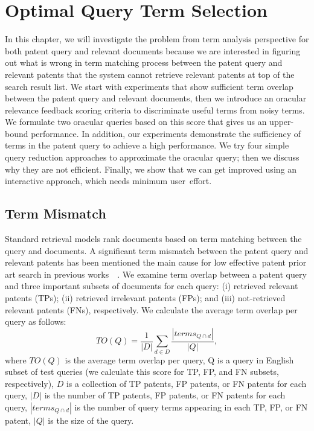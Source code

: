 \chapter{Optimal Query Term Selection}
\label{cha:analysis}
In this chapter, we will investigate the problem from term analysis perspective for both patent query and relevant documents because we are interested 
in figuring out what is wrong in term matching process between the patent query and relevant patents 
that the system cannot retrieve relevant patents at top of the search result list. 
We start with experiments that show sufficient term overlap between the patent query and relevant documents, 
then we introduce an oracular relevance feedback scoring criteria to discriminate useful terms from noisy terms. 
We formulate two oracular queries based on this score that gives us an upper-bound performance. In addition, our 
experiments demonstrate the sufficiency of terms in the patent query to achieve a high performance. 
We try four simple query reduction approaches to approximate the oracular query; then we discuss why they are not efficient.  
Finally, we show that we can get improved using an interactive approach, which needs minimum user~effort.

\section{Term Mismatch}
\label{sec:termmismatch}
%
Standard retrieval models rank documents based on term matching between the query and documents.  
A significant term mismatch between the patent query and relevant patents has been mentioned the
main cause for low effective patent prior art search in previous works~\citep{roda2010clef}~\citep{magdy2012toward}. 
We examine term overlap between a patent query and three important subsets of documents for each query: (i) retrieved relevant patents (TPs); (ii) retrieved irrelevant patents (FPs); and (iii) not-retrieved relevant patents (FNs), respectively. We calculate the average term overlap per query as follows:
\begin{equation} 
TO (Q) = \frac{1}{|D|}\sum_{d\in D}\frac{|terms_{Q\cap d}|}{|Q|},
\label{eq:fntermoverlap}
\end{equation}
where $TO(Q)$ is the average term overlap per query, Q is a query in English subset of test queries (we calculate this score for TP, FP, and FN subsets, respectively), $D$ is a collection of TP patents, FP patents, or FN patents for each query, $|D|$ is the number of TP patents, FP patents, or FN patents for each query, $ |terms_{Q\cap d}| $ is the number of query terms appearing in each TP, FP, or FN patent, $ |Q| $ is the size of the query.

